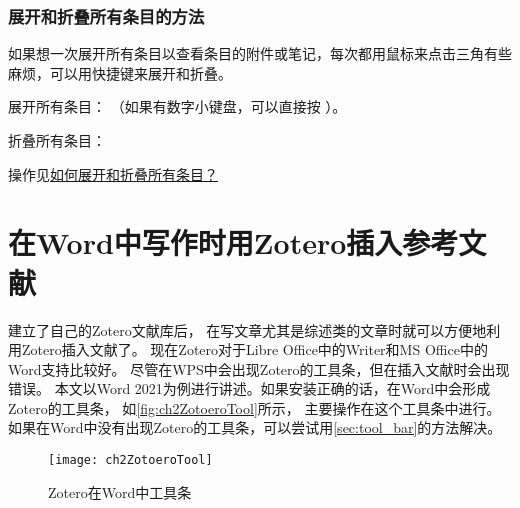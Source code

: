 \documentclass[theorem=false,mathfont=none,openany,sub3section]{easybook}
\begin{document}
\subsection{展开和折叠所有条目的方法}\label{sec:fold_collapse_item}
如果想一次展开所有条目以查看条目的附件或笔记，每次都用鼠标来点击三角有些麻烦，可以用快捷键来展开和折叠。

展开所有条目： （如果有数字小键盘，可以直接按\menu{+} ）。

 折叠所有条目：\keys{-}

操作见\href{https://zhuanlan.zhihu.com/p/544153534}{如何展开和折叠所有条目？}



\chapter{在Word中写作时用Zotero插入参考文献}\label{ch:insert}
建立了自己的Zotero文献库后，
在写文章尤其是综述类的文章时就可以方便地利用Zotero插入文献了。
现在Zotero对于Libre Office中的Writer和MS Office中的Word支持比较好。
尽管在WPS中会出现Zotero的工具条，但在插入文献时会出现错误。
本文以Word 2021为例进行讲述。如果安装正确的话，在Word中会形成Zotero的工具条，
如\autoref{fig:ch2ZotoeroTool}所示，
主要操作在这个工具条中进行。
如果在Word中没有出现Zotero的工具条，可以尝试用\cref{sec:tool_bar}的方法解决。
\begin{figure}[htbp]
	\centering
	\texttt{[image: ch2ZotoeroTool]}
	\caption{Zotero在Word中工具条}
	\label{fig:ch2ZotoeroTool}
\end{figure}
\end{document}
